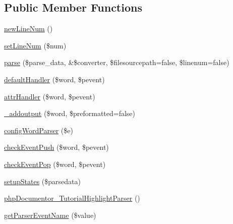 \subsection*{\-Public \-Member \-Functions}
\begin{DoxyCompactItemize}
\item 
\hyperlink{classphp_documentor___tutorial_highlight_parser_a0aa5ad6874d7cb5842fb75d9d9edd1cc}{new\-Line\-Num} ()
\item 
\hyperlink{classphp_documentor___tutorial_highlight_parser_a855be7133354603f9f7f33da66ec5a30}{set\-Line\-Num} (\$num)
\item 
\hyperlink{classphp_documentor___tutorial_highlight_parser_a3e6ac528184258b788709c5298db7719}{parse} (\$parse\-\_\-data, \&\$converter, \$filesourcepath=false, \$linenum=false)
\item 
\hyperlink{classphp_documentor___tutorial_highlight_parser_a4d5d6de1bd28d678fdca6e4d5e0076b0}{default\-Handler} (\$word, \$pevent)
\item 
\hyperlink{classphp_documentor___tutorial_highlight_parser_aca93ae59baadad268faadf6bb922a7f6}{attr\-Handler} (\$word, \$pevent)
\item 
\hyperlink{classphp_documentor___tutorial_highlight_parser_a1acd6d7a8b8e29e7ddfa0f843399d65b}{\-\_\-addoutput} (\$word, \$preformatted=false)
\item 
\hyperlink{classphp_documentor___tutorial_highlight_parser_a283368f67f931488905c6f3f84b1c549}{config\-Word\-Parser} (\$e)
\item 
\hyperlink{classphp_documentor___tutorial_highlight_parser_a912ba83822697d200d7e2771166f6718}{check\-Event\-Push} (\$word, \$pevent)
\item 
\hyperlink{classphp_documentor___tutorial_highlight_parser_a9f5347fcba49d2192e689e417671ce18}{check\-Event\-Pop} (\$word, \$pevent)
\item 
\hyperlink{classphp_documentor___tutorial_highlight_parser_aa78ac0cfd4a15cb88503eb96babffa87}{setup\-States} (\$parsedata)
\item 
\hyperlink{classphp_documentor___tutorial_highlight_parser_ad472e569c77f4a6f36a2a27222182f87}{php\-Documentor\-\_\-\-Tutorial\-Highlight\-Parser} ()
\item 
\hyperlink{classphp_documentor___tutorial_highlight_parser_a9cc8a14f4bce21f0058f33036a2eb460}{get\-Parser\-Event\-Name} (\$value)
\end{DoxyCompactItemize}
